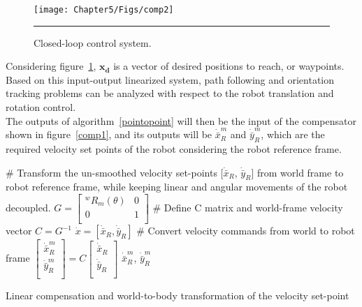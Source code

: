 \begin{figure}[H]
	\centering
	\texttt{[image: Chapter5/Figs/comp2]}
	\rule{35em}{0.5pt}
	\caption{Closed-loop control system.} 
	\label{comp2}
\end{figure}
Considering figure~\ref{comp2}, $\mathbf{x_d}$ is a vector of desired positions to reach, or waypoints.
Based on this input-output linearized system, path following and orientation tracking problems can be analyzed with respect to the robot translation and rotation control.\\
The outputs of algorithm~\ref{pointopoint} will then be the input of the compensator shown in figure~\ref{comp1}, and its outputs will be $\dot{\bar{x}}_R^m$ and $\dot{\bar{y}}_R^m$, which are the required velocity set points of the robot considering the robot reference frame.

\begin{algorithm}[H]
	\# Transform the un-smoothed velocity set-points [$\dot{\bar{x}}_R$, $\dot{\bar{y}}_R$] from world frame to robot reference frame, while keeping linear and angular movements of the robot decoupled.\;
	$G=\begin{bmatrix}
	^wR_m(\theta) & 0\\
	0 & 1\\
	\end{bmatrix}$\;
	\# Define C matrix and world-frame velocity vector\;
	$C = G^{-1}$\;
	$\dot{x}=[\dot{\bar{x}}_R, \dot{\bar{y}}_R]$\;
	\# Convert velocity commands from world to robot frame\;
	$\begin{bmatrix}
	\dot{\bar{x}}_R^m\\
	\dot{\bar{y}}_R^m\\
	\end{bmatrix}=C
	\begin{bmatrix}
	\dot{\bar{x}}_R\\
	\dot{\bar{y}}_R\\
	\end{bmatrix}
	$\;
	\Return $\dot{\bar{x}}_R^m$, $\dot{\bar{y}}_R^m$
	\caption{Linear compensation and world-to-body transformation of the velocity set-point} 
	\label{compensator}
\end{algorithm}

